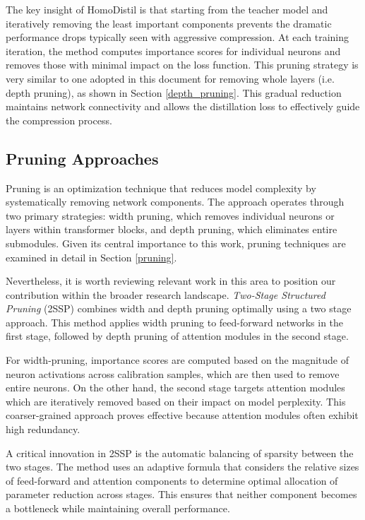 The key insight of HomoDistil is that starting from the teacher model and iteratively removing the least important components prevents the dramatic performance drops typically seen with aggressive compression. At each training iteration, the method computes importance scores for individual neurons and removes those with minimal impact on the loss function. This pruning strategy is very similar to one adopted in this document for removing whole layers (i.e. depth pruning), as shown in Section \ref{depth_pruning}. This gradual reduction maintains network connectivity and allows the distillation loss to effectively guide the compression process.

\subsection{Pruning Approaches}

Pruning is an optimization technique that reduces model complexity by systematically removing network components. The approach operates through two primary strategies: width pruning, which removes individual neurons or layers within transformer blocks, and depth pruning, which eliminates entire submodules. Given its central importance to this work, pruning techniques are examined in detail in Section \ref{pruning}.

Nevertheless, it is worth reviewing relevant work in this area to position our contribution within the broader research landscape. \textit{Two-Stage Structured Pruning} (2SSP) \cite{2ssp} combines width and depth pruning optimally using a two stage approach. This method applies width pruning to feed-forward networks in the first stage, followed by depth pruning of attention modules in the second stage.

For width-pruning, importance scores are computed based on the magnitude of neuron activations across calibration samples, which are then used to remove entire neurons. On the other hand, the second stage targets attention modules which are iteratively removed based on their impact on model perplexity. This coarser-grained approach proves effective because attention modules often exhibit high redundancy.

A critical innovation in 2SSP is the automatic balancing of sparsity between the two stages. The method uses an adaptive formula that considers the relative sizes of feed-forward and attention components to determine optimal allocation of parameter reduction across stages. This ensures that neither component becomes a bottleneck while maintaining overall performance.

